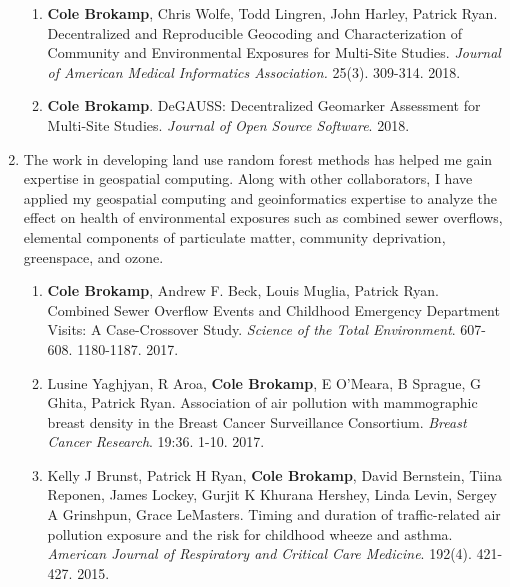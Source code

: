 \documentclass{nihbiosketch}
\begin{document}
\begin{enumerate}
\begin{enumerate}
	
	\item \textbf{Cole Brokamp}, Chris Wolfe, Todd Lingren, John Harley, Patrick Ryan. Decentralized and Reproducible Geocoding and Characterization of Community and Environmental Exposures for Multi-Site Studies. \textit{Journal of American Medical Informatics Association.} 25(3). 309-314. 2018.
	
	\item \textbf{Cole Brokamp}. DeGAUSS: Decentralized Geomarker Assessment for Multi-Site Studies. \textit{Journal of Open Source Software}. 2018. 
	
\end{enumerate}

\item The work in developing land use random forest methods has helped me gain expertise in geospatial computing.  Along with other collaborators, I have applied my geospatial computing and geoinformatics expertise to analyze the effect on health of environmental exposures such as combined sewer overflows, elemental components of particulate matter, community deprivation, greenspace, and ozone.

\begin{enumerate}
	
	\item \textbf{Cole Brokamp}, Andrew F. Beck, Louis Muglia, Patrick Ryan. Combined Sewer Overflow Events and Childhood Emergency Department Visits: A Case-Crossover Study. \textit{Science of the Total Environment}. 607-608. 1180-1187. 2017.
	
	\item Lusine Yaghjyan, R Aroa, \textbf{Cole Brokamp}, E O'Meara, B Sprague, G Ghita, Patrick Ryan. Association of air pollution with mammographic breast density in the Breast Cancer Surveillance Consortium. \textit{Breast Cancer Research}. 19:36. 1-10. 2017.
	
	\item Kelly J Brunst, Patrick H Ryan, \textbf{Cole Brokamp}, David Bernstein, Tiina Reponen, James Lockey, Gurjit K Khurana Hershey, Linda Levin, Sergey A Grinshpun, Grace LeMasters. Timing and duration of traffic-related air pollution exposure and the risk for childhood wheeze and asthma. \textit{American Journal of Respiratory and Critical Care Medicine}. 192(4). 421-427. 2015.
	
	
\end{enumerate}



\end{enumerate}
\end{document}
